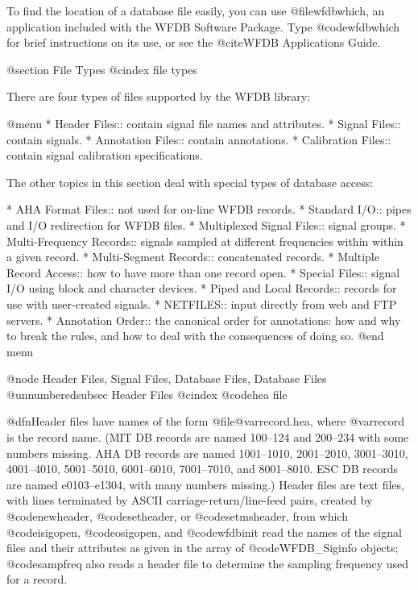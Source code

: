 {{{{{{{{{{To find the location of a database file easily, you can use @file{wfdbwhich},
an application included with the WFDB Software Package.  Type
@code{wfdbwhich} for brief instructions on its use, or see the @cite{WFDB
Applications Guide}.

@section File Types
@cindex file types

There are four types of files supported by the WFDB library:

@menu
* Header Files::		contain signal file names and attributes.
* Signal Files::		contain signals.
* Annotation Files::		contain annotations.
* Calibration Files::		contain signal calibration specifications.

The other topics in this section deal with special types of database access:

* AHA Format Files::		not used for on-line WFDB records.
* Standard I/O::		pipes and I/O redirection for WFDB files.
* Multiplexed Signal Files::	signal groups.
* Multi-Frequency Records::     signals sampled at different frequencies within
                                 within a given record.
* Multi-Segment Records::       concatenated records.
* Multiple Record Access::	how to have more than one record open.
* Special Files::		signal I/O using block and character devices.
* Piped and Local Records::	records for use with user-created signals.
* NETFILES::			input directly from web and FTP servers.
* Annotation Order::            the canonical order for annotations:
                                 how and why to break the rules, and how
                                 to deal with the consequences of doing so.
@end menu

@node     Header Files, Signal Files, Database Files, Database Files
@unnumberedsubsec Header Files
@cindex @code{hea} file

@dfn{Header files} have names of the form @file{@var{record}.hea}, where
@var{record} is the record name.  (MIT DB records are named 100--124 and
200--234 with some numbers missing.  AHA DB records are named
1001--1010, 2001--2010, 3001--3010, 4001--4010, 5001--5010, 6001--6010,
7001--7010, and 8001--8010.  ESC DB records are named e0103--e1304, with
many numbers missing.)  Header files are text files, with lines
terminated by ASCII carriage-return/line-feed pairs, created by
@code{newheader}, @code{setheader}, or @code{setmsheader}, from which
@code{isigopen}, @code{osigopen}, and @code{wfdbinit} read the names of
the signal files and their attributes as given in the array of
@code{WFDB_Siginfo} objects; @code{sampfreq} also reads a header
file to determine the sampling frequency used for a record.

}}}}}}}}}}
